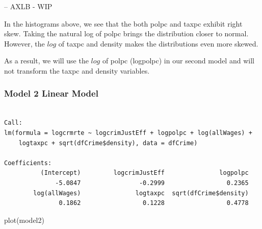 \documentclass[]{article}
\newenvironment{Shaded}{}{}
\newcommand{\DataTypeTok}[1]{#1}
\newcommand{\KeywordTok}[1]{\textcolor[rgb]{0.00,0.00,1.00}{#1}}
\newcommand{\NormalTok}[1]{#1}
\newcommand{\OperatorTok}[1]{#1}
\newcommand{\StringTok}[1]{\textcolor[rgb]{0.00,0.50,0.50}{#1}}
\begin{document}
-- AXLB - WIP

In the histograms above, we see that the both polpc and taxpc exhibit
right skew. Taking the natural log of polpc brings the distribution
closer to normal. However, the \(log\) of taxpc and density makes the
distributions even more skewed.

As a result, we will use the \(log\) of polpc (logpolpc) in our second
model and will not transform the taxpc and density variables.

\hypertarget{model-2-linear-model}{%
\subsubsection{Model 2 Linear Model}\label{model-2-linear-model}}

\begin{Shaded}
\end{Shaded}

\begin{verbatim}

Call:
lm(formula = logcrmrte ~ logcrimJustEff + logpolpc + log(allWages) + 
    logtaxpc + sqrt(dfCrime$density), data = dfCrime)

Coefficients:
          (Intercept)         logcrimJustEff               logpolpc  
              -5.0847                -0.2999                 0.2365  
        log(allWages)               logtaxpc  sqrt(dfCrime$density)  
               0.1862                 0.1228                 0.4778  
\end{verbatim}

\begin{Shaded}
\begin{Highlighting}[]
\KeywordTok{plot}\NormalTok{(model2)}
\end{Highlighting}
\end{Shaded}
\end{document}
